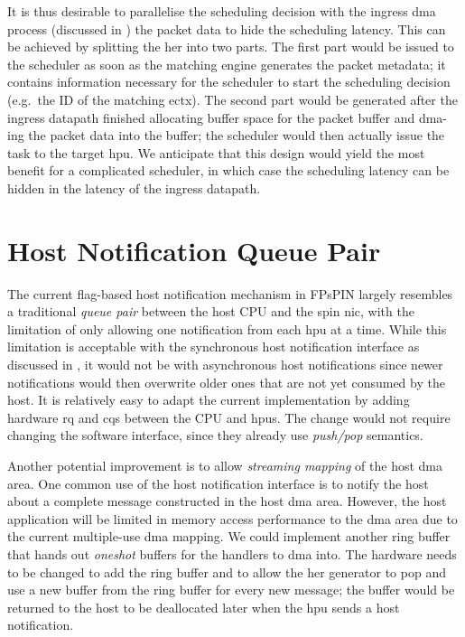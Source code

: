 It is thus desirable to parallelise the scheduling decision with the ingress \ac{dma} process (discussed in ) the packet data to hide the scheduling latency.  This can be achieved by splitting the \ac{her} into two parts.  The first part would be issued to the scheduler as soon as the matching engine generates the packet metadata; it contains information necessary for the scheduler to start the scheduling decision (e.g.\ the ID of the matching \ac{ectx}).  The second part would be generated after the ingress datapath finished allocating buffer space for the packet buffer and \ac{dma}-ing the packet data into the buffer; the scheduler would then actually issue the task to the target \ac{hpu}.  We anticipate that this design would yield the most benefit for a complicated scheduler, in which case the scheduling latency can be hidden in the latency of the ingress datapath.

\section{Host Notification Queue Pair} \label{sec:host-dma-qp}

The current flag-based host notification mechanism in FPsPIN largely resembles a traditional \emph{queue pair} between the host CPU and the \ac{spin} \ac{nic}, with the limitation of only allowing one notification from each \ac{hpu} at a time.  While this limitation is acceptable with the synchronous host notification interface as discussed in , it would not be with asynchronous host notifications since newer notifications would then overwrite older ones that are not yet consumed by the host.  It is relatively easy to adapt the current implementation by adding hardware \ac{rq} and \ac{cq}s between the CPU and \ac{hpu}s.  The change would not require changing the software interface, since they already use \emph{push/pop} semantics.

Another potential improvement is to allow \emph{streaming mapping} of the host \ac{dma} area.  One common use of the host notification interface is to notify the host about a complete message constructed in the host \ac{dma} area.  However, the host application will be limited in memory access performance to the \ac{dma} area due to the current multiple-use \ac{dma} mapping.  We could implement another ring buffer that hands out \emph{oneshot} buffers for the handlers to \ac{dma} into.  The hardware needs to be changed to add the ring buffer and to allow the \ac{her} generator to pop and use a new buffer from the ring buffer for every new message; the buffer would be returned to the host to be deallocated later when the \ac{hpu} sends a host notification.

